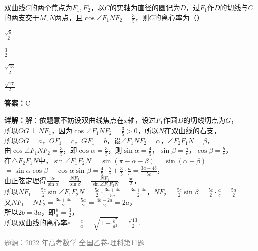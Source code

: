 \begin{question}
双曲线$C$的两个焦点为$F_1, F_2$，以$C$的实轴为直径的圆记为$D$，过$F_1$作$D$的切线与$C$的两支交于$M, N$两点，且$\cos\angle F_1NF_2 = \frac{3}{5}$，则$C$的离心率为（\qquad）
\begin{choices}
\item $\frac{\sqrt{5}}{2}$
\item $\frac{3}{2}$
\item $\frac{\sqrt{13}}{2}$
\item $\frac{\sqrt{17}}{2}$
\end{choices}
\begin{solution}
\textbf{答案：}C

\textbf{详解：}解：依题意不妨设双曲线焦点在$x$轴，设过$F_1$作圆$D$的切线切点为$G$，\\所以$OG \perp NF_1$，因为$\cos\angle F_1NF_2 = \frac{3}{5} > 0$，所以$N$在双曲线的右支，\\所以$OG = a$，$OF_1 = c$，$GF_1 = b$，设$\angle F_1NF_2 = \alpha$，$\angle F_2F_1N = \beta$，\\由$\cos\angle F_1NF_2 = \frac{3}{5}$，即$\cos\alpha = \frac{3}{5}$，则$\sin\alpha = \frac{4}{5}$，$\sin\beta = \frac{a}{c}$，$\cos\beta = \frac{b}{c}$，\\在$\triangle F_2F_1N$中，$\sin\angle F_1F_2N = \sin(\pi-\alpha-\beta) = \sin(\alpha+\beta)$\\$= \sin\alpha\cos\beta + \cos\alpha\sin\beta = \frac{4}{5}\cdot\frac{b}{c} + \frac{3}{5}\cdot\frac{a}{c} = \frac{3a+4b}{5c}$，\\由正弦定理得$\frac{2c}{\sin\alpha} = \frac{NF_2}{\sin\beta} = \frac{NF_1}{\sin\angle F_1F_2N} = \frac{5c}{2}$，\\所以$NF_1 = \frac{5c}{2}\sin\angle F_1F_2N = \frac{5c}{2}\cdot\frac{3a+4b}{5c} = \frac{3a+4b}{2}$，$NF_2 = \frac{5c}{2}\sin\beta = \frac{5c}{2}\cdot\frac{a}{c} = \frac{5a}{2}$\\又$NF_1 - NF_2 = \frac{3a+4b}{2} - \frac{5a}{2} = \frac{4b-2a}{2} = 2a$，\\所以$2b = 3a$，即$\frac{b}{a} = \frac{3}{2}$，\\所以双曲线的离心率$e = \frac{c}{a} = \sqrt{1+\frac{b^2}{a^2}} = \frac{\sqrt{13}}{2}$.

\textcolor{gray}{\footnotesize 题源：2022 年高考数学 全国乙卷-理科第11题}
\end{solution}
\end{question}


